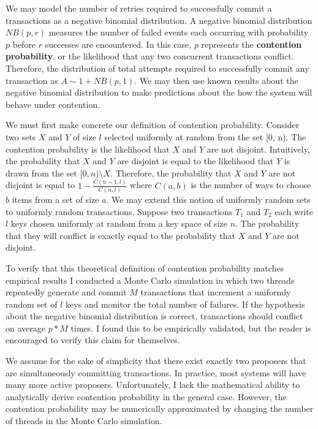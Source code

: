 \documentclass[../main.tex]{subfiles}
\begin{document}
  We may model the number of retries required to successfully commit a transactions as a negative
  binomial distribution. A negative binomial distribution $NB(p, r)$ measures the number of
  failed events each occurring with probability $p$ before $r$ successes are encountered. In
  this case, $p$ represents the \textbf{contention probability}, or the likelihood that any two
  concurrent transactions conflict. Therefore, the distribution of total attempts required to
  successfully commit any transaction as $A \sim 1 + NB(p, 1)$. We may then use known results about
  the negative binomial distribution to make predictions about the how the system will behave under
  contention.

  We must first make concrete our definition of contention probability. Consider two sets $X$ and
  $Y$ of size $l$ selected uniformly at random from the set [0, n). The contention probability is
  the likelihood that $X$ and $Y$ are not disjoint. Intuitively, the probability that $X$ and $Y$
  are disjoint is equal to the likelihood that $Y$ is drawn from the set $[0, n) \setminus X$.
  Therefore, the probability that $X$ and $Y$ are not disjoint is equal to
  $1 - \frac{C(n - 1, l)}{C(n, l)}$ where $C(a, b)$ is the number of ways to choose $b$ items from a
  set of size $a$. We may extend this notion of uniformly random sets to uniformly random
  transactions. Suppose two transactions $T_1$ and $T_2$ each write $l$ keys chosen uniformly at
  random from a key space of size $n$. The probability that they will conflict is exactly equal to
  the probability that $X$ and $Y$ are not disjoint.

  To verify that this theoretical definition of contention probability matches empirical results I
  conducted a Monte Carlo simulation in which two threads repeatedly generate and commit $M$
  transactions that increment a uniformly random set of $l$ keys and monitor the total number of
  failures. If the hypothesis about the negative binomial distribution is correct, transactions
  should conflict on average $p * M$ times. I found this to be empirically validated, but the reader
  is encouraged to verify this claim for themselves.

  We assume for the sake of simplicity that there exist exactly two proposers that are
  simultaneously committing transactions. In practice, most systems will have many more active
  proposers. Unfortunately, I lack the mathematical ability to analytically derive contention
  probability in the general case. However, the contention probability may be numerically
  approximated by changing the number of threads in the Monte Carlo simulation.
\end{document}

